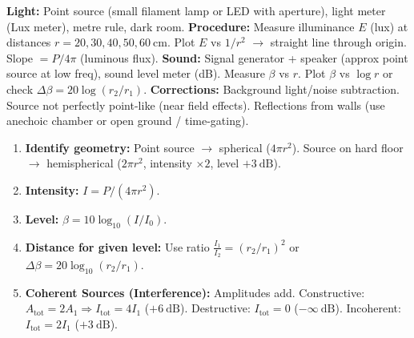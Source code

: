\documentclass[11pt]{article}
\begin{document}
\begin{experience}
\textbf{Light:} Point source (small filament lamp or LED with aperture), light meter (Lux meter), metre rule, dark room.
\textbf{Procedure:} Measure illuminance $E$ (lux) at distances $r = 20, 30, 40, 50, 60\ \mathrm{cm}$. Plot $E$ vs $1/r^2$ $\rightarrow$ straight line through origin. Slope $= P/4\pi$ (luminous flux).
\textbf{Sound:} Signal generator + speaker (approx point source at low freq), sound level meter (dB). Measure $\beta$ vs $r$. Plot $\beta$ vs $\log r$ or check $\Delta \beta = 20\log(r_2/r_1)$.
\textbf{Corrections:} Background light/noise subtraction. Source not perfectly point-like (near field effects). Reflections from walls (use anechoic chamber or open ground / time-gating).
\end{experience}

\begin{methode}
\begin{enumerate}
\item \textbf{Identify geometry:} Point source $\rightarrow$ spherical ($4\pi r^2$). Source on hard floor $\rightarrow$ hemispherical ($2\pi r^2$, intensity $\times 2$, level $+3\ \mathrm{dB}$).
\item \textbf{Intensity:} $I = P/(4\pi r^2)$.
\item \textbf{Level:} $\beta = 10\log_{10}(I/I_0)$.
\item \textbf{Distance for given level:} Use ratio $\frac{I_1}{I_2} = (r_2/r_1)^2$ or $\Delta\beta = 20\log_{10}(r_2/r_1)$.
\item \textbf{Coherent Sources (Interference):} Amplitudes add. Constructive: $A_{\text{tot}} = 2A_1 \Rightarrow I_{\text{tot}} = 4I_1$ ($+6\ \mathrm{dB}$). Destructive: $I_{\text{tot}} = 0$ ($-\infty\ \mathrm{dB}$). Incoherent: $I_{\text{tot}} = 2I_1$ ($+3\ \mathrm{dB}$).
\end{enumerate}
\end{methode}
\end{document}
